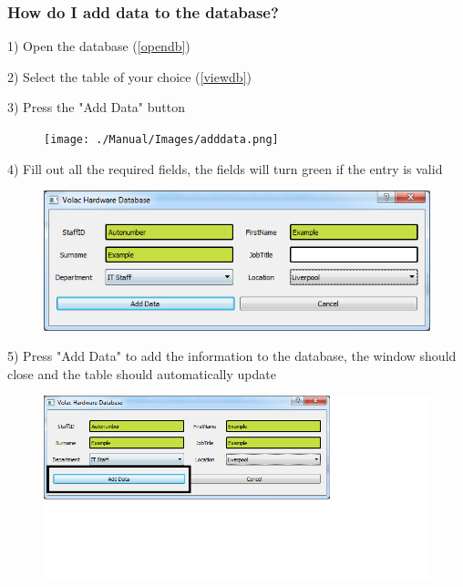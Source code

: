 \subsubsection{How do I add data to the database?}\label{adddata}

1) Open the database (\ref{opendb})

2) Select the table of your choice (\ref{viewdb})

3) Press the "Add Data" button

\begin{figure}[H]
    \texttt{[image: ./Manual/Images/adddata.png]}
\end{figure}

4) Fill out all the required fields, the fields will turn green if the entry is valid

\begin{figure}[H]
    \includegraphics[width=\textwidth]{./Manual/Images/adddata2.png}
\end{figure}

5) Press "Add Data" to add the information to the database, the window should close and the table should automatically update

\begin{figure}[H]
    \includegraphics[width=\textwidth]{./Manual/Images/adddata3.png}
\end{figure}

